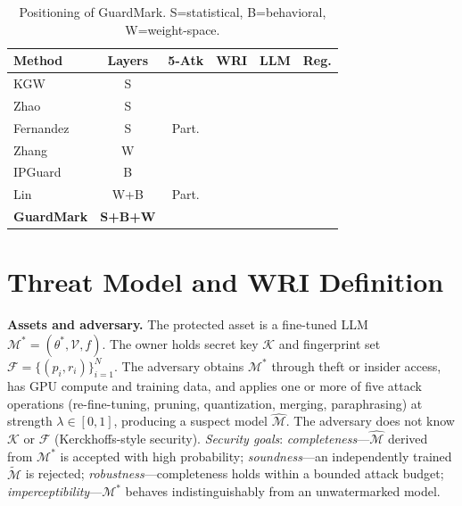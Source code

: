 \documentclass[conference]{IEEEtran}
\newcommand{\cmark}{\ding{51}}
\newcommand{\xmark}{\ding{55}}
\newcommand{\M}{\mathcal{M}}
\newcommand{\K}{\mathcal{K}}
\newcommand{\F}{\mathcal{F}}
\begin{document}
\begin{table}[H]
\caption{Positioning of GuardMark. S=statistical, B=behavioral, W=weight-space.}
\label{tab:related}
\renewcommand{\arraystretch}{1.1}
\begin{tabularx}{\columnwidth}{l c c c c c}
\toprule
\textbf{Method} & \textbf{Layers} & \textbf{5-Atk} & \textbf{WRI} &
\textbf{LLM} & \textbf{Reg.} \\
\midrule
KGW~\cite{kirchenbauer2023watermark}  & S   & \xmark & \xmark & \cmark & \xmark \\
Zhao~\cite{zhao2023protecting}        & S   & \xmark & \xmark & \cmark & \xmark \\
Fernandez~\cite{fernandez2023three}   & S   & Part.  & \xmark & \cmark & \xmark \\
Zhang~\cite{zhang2018protecting}      & W   & \xmark & \xmark & \xmark & \xmark \\
IPGuard~\cite{cao2021ipguard}         & B   & \xmark & \xmark & \xmark & \xmark \\
Lin~\cite{lin2024towards}             & W+B & Part.  & \xmark & \cmark & \xmark \\
\textbf{GuardMark}                    & \textbf{S+B+W} & \cmark & \cmark & \cmark & \cmark \\
\bottomrule
\end{tabularx}
\end{table}

\section{Threat Model and WRI Definition}
\label{sec:threat}

\textbf{Assets and adversary.}
The protected asset is a fine-tuned LLM $\M^* = (\theta^*, \mathcal{V}, f)$.
The owner holds secret key $\K$ and fingerprint set
$\F = \{(p_i, r_i)\}_{i=1}^{N}$.
The adversary obtains $\M^*$ through theft or insider access, has GPU compute
and training data, and applies one or more of five attack operations
(re-fine-tuning, pruning, quantization, merging, paraphrasing) at strength
$\lambda \in [0,1]$, producing a suspect model $\hat{\M}$.
The adversary does not know $\K$ or $\F$ (Kerckhoffs-style security).
\emph{Security goals}: \textit{completeness}---$\hat{\M}$ derived from $\M^*$
is accepted with high probability; \textit{soundness}---an independently trained
$\tilde{\M}$ is rejected; \textit{robustness}---completeness holds within a
bounded attack budget; \textit{imperceptibility}---$\M^*$ behaves
indistinguishably from an unwatermarked model.
\end{document}

